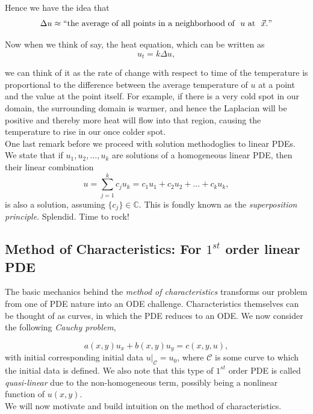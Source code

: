 Hence we have the idea that $$\Delta u \approx ``\mbox{the average of all points in a neighborhood of }\  u \mbox{ at }\  \vec{x}."$$

Now when we think of say, the heat equation, which can be written as $$u_{t} = k \Delta u,$$

we can think of it as the rate of change with respect to time of the temperature is proportional to the difference between the average temperature of $u$ at a point and the value at the point itself. For example, if there is a very cold spot in our domain, the surrounding domain is warmer, and hence the Laplacian will be positive and thereby more heat will flow into that region, causing the temperature to rise in our once colder spot.\\

%
%

One last remark before we proceed with solution methodoglies to linear PDEs. We state that if $u_1,u_2,\ldots,u_k$ are solutions of a homogeneous linear PDE, then their linear combination $$u = \sum_{j=1}^{k} c_j u_k = c_1 u_1 + c_2 u_2 + \ldots + c_k u_k,$$ is also a solution, assuming $\{ c_j \}\in\mathbb{C}$. This is fondly known as the \emph{superposition principle}. Splendid. Time to rock!


%
%

\subsection{Method of Characteristics: For $1^{st}$ order linear PDE}

The basic mechanics behind the \emph{method of characteristics} transforms our problem from one of PDE nature into an ODE challenge. Characteristics themselves can be thought of as curves, in which the PDE reduces to an ODE. We now consider the following \emph{Cauchy problem},

$$a(x,y) u_x + b(x,y) u_y = c(x,y,u),$$ with initial corresponding initial data $u|_\mathscr{C} = u_0$, where $\mathscr{C}$ is some curve to which the initial data is defined. We also note that this type of $1^{st}$ order PDE is called \emph{quasi-linear} due to the non-homogeneous term, possibly being a nonlinear function of $u(x,y)$.\\

We will now motivate and build intuition on the method of characteristics.

